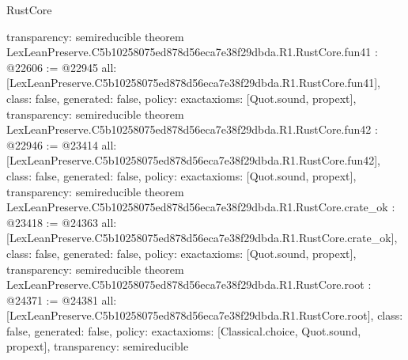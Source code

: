 \begin{lexlean}{RustCore}
\begin{coremodule}
{  transparency: semireducible
}
theorem LexLeanPreserve.C5b10258075ed878d56eca7e38f29dbda.R1.RustCore.fun41 : @22606 := @22945 {
  all: [LexLeanPreserve.C5b10258075ed878d56eca7e38f29dbda.R1.RustCore.fun41],
  class: false,
  generated: false,
  policy: exact{axioms: [Quot.sound, propext]},
  transparency: semireducible
}
theorem LexLeanPreserve.C5b10258075ed878d56eca7e38f29dbda.R1.RustCore.fun42 : @22946 := @23414 {
  all: [LexLeanPreserve.C5b10258075ed878d56eca7e38f29dbda.R1.RustCore.fun42],
  class: false,
  generated: false,
  policy: exact{axioms: [Quot.sound, propext]},
  transparency: semireducible
}
theorem LexLeanPreserve.C5b10258075ed878d56eca7e38f29dbda.R1.RustCore.crate_ok : @23418 := @24363 {
  all: [LexLeanPreserve.C5b10258075ed878d56eca7e38f29dbda.R1.RustCore.crate_ok],
  class: false,
  generated: false,
  policy: exact{axioms: [Quot.sound, propext]},
  transparency: semireducible
}
theorem LexLeanPreserve.C5b10258075ed878d56eca7e38f29dbda.R1.RustCore.root : @24371 := @24381 {
  all: [LexLeanPreserve.C5b10258075ed878d56eca7e38f29dbda.R1.RustCore.root],
  class: false,
  generated: false,
  policy: exact{axioms: [Classical.choice, Quot.sound, propext]},
  transparency: semireducible
}


\end{coremodule}
\end{lexlean}
